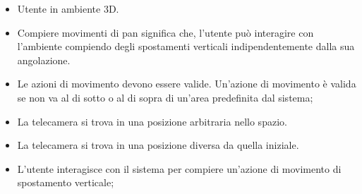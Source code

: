     \UCdsc
        { %
            \begin{itemize}
                \item Utente in ambiente 3D.
            \end{itemize}
        }
        { %
            \begin{itemize}
                \item Compiere movimenti di pan significa che, l'utente può interagire con l'ambiente compiendo degli spostamenti verticali indipendentemente dalla sua angolazione.
            \end{itemize}
        }
        { %
            \begin{itemize}
                \item Le azioni di movimento devono essere valide. Un'azione di movimento è valida se non va al di sotto o al di sopra di un'area predefinita dal sistema;
                \item La telecamera si trova in una posizione arbitraria nello spazio.
            \end{itemize}
        }
        { %
            \begin{itemize}
                \item La telecamera si trova in una posizione diversa da quella iniziale.
            \end{itemize}
        }
        { %
            \begin{itemize}
                \item L'utente interagisce con il sistema per compiere un'azione di movimento di spostamento verticale;
            \end{itemize}
        }


